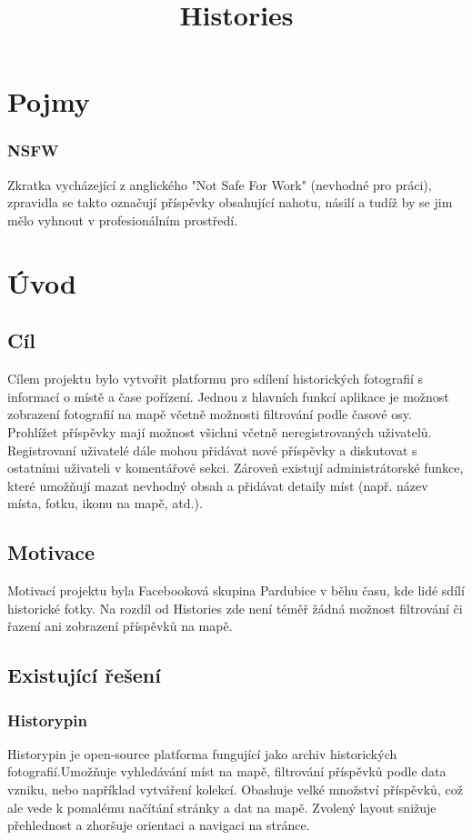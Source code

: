 \documentclass[12pt, a4paper,
 twoside,        %
 openright
]{report}
\title{Histories} %
\author{\name} %
\date{\publicationYear} %
\begin{document}
\pagestyle{empty}



\chapter{Pojmy}
\subsection{NSFW}
Zkratka vycházející z anglického "Not Safe For Work" (nevhodné pro práci), zpravidla se takto označují příspěvky obsahující nahotu, násilí a tudíž by se jim mělo vyhnout v profesionálním prostředí.


\chapter{Úvod}
\section{Cíl}
Cílem projektu bylo vytvořit platformu pro sdílení historických fotografií
s informací o místě a čase pořízení. Jednou z hlavních funkcí aplikace je možnost
zobrazení fotografií na mapě včetně možnosti filtrování podle časové osy. Prohlížet 
příspěvky mají možnost všichni včetně neregistrovaných uživatelů. Registrovaní 
uživatelé dále mohou přidávat nové příspěvky a diskutovat s ostatními uživateli v
komentářové sekci. Zároveň existují administrátorské funkce, které umožňují mazat
nevhodný obsah a přidávat detaily míst (např. název místa, fotku, ikonu na mapě, atd.).

\section{Motivace}
Motivací projektu byla Facebooková skupina Pardubice v běhu času\cite{PardubiceVBehuCasuFB}, kde lidé 
sdílí historické fotky. Na rozdíl od Histories zde není téměř žádná možnost filtrování či 
řazení ani zobrazení příspěvků na mapě.




\section{Existující řešení}
\subsection{Historypin}
Historypin je open-source platforma fungující jako archiv historických fotografií.Umožňuje vyhledávání míst na mapě, filtrování příspěvků podle data vzniku, nebo například vytváření kolekcí. Obashuje velké množství příspěvků, což ale vede k pomalému načítání stránky a dat na mapě. Zvolený layout snižuje přehlednost a zhoršuje orientaci a navigaci na stránce.
\end{document}
